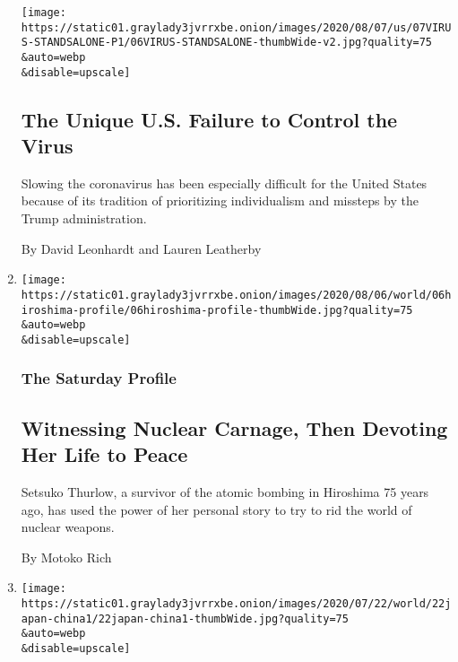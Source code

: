 \begin{enumerate}
  \texttt{[image: https://static01.graylady3jvrrxbe.onion/images/2020/08/07/us/07VIRUS-STANDSALONE-P1/06VIRUS-STANDSALONE-thumbWide-v2.jpg?quality=75\\\&auto=webp\\\&disable=upscale]}

  \hypertarget{the-unique-us-failure-to-control-the-virus}{%
  \subsection{The Unique U.S. Failure to Control the
  Virus}\label{the-unique-us-failure-to-control-the-virus}}

  Slowing the coronavirus has been especially difficult for the United
  States because of its tradition of prioritizing individualism and
  missteps by the Trump administration.

  By David Leonhardt and Lauren Leatherby
\item
  \href{/2020/08/06/world/asia/hiroshima-japan-setsuko-thurlow.html}{}

  \texttt{[image: https://static01.graylady3jvrrxbe.onion/images/2020/08/06/world/06hiroshima-profile/06hiroshima-profile-thumbWide.jpg?quality=75\\\&auto=webp\\\&disable=upscale]}

  \hypertarget{the-saturday-profile}{%
  \subsubsection{The Saturday Profile}\label{the-saturday-profile}}

  \hypertarget{witnessing-nuclear-carnage-then-devoting-her-life-to-peace}{%
  \subsection{Witnessing Nuclear Carnage, Then Devoting Her Life to
  Peace}\label{witnessing-nuclear-carnage-then-devoting-her-life-to-peace}}

  Setsuko Thurlow, a survivor of the atomic bombing in Hiroshima 75
  years ago, has used the power of her personal story to try to rid the
  world of nuclear weapons.

  By Motoko Rich
\item
  \href{/2020/07/25/world/asia/japan-china-xi.html}{}

  \texttt{[image: https://static01.graylady3jvrrxbe.onion/images/2020/07/22/world/22japan-china1/22japan-china1-thumbWide.jpg?quality=75\\\&auto=webp\\\&disable=upscale]}

  \hypertarget{as-the-world-gets-tougher-on-china-japan-tries-to-thread-a-needle}{%
}
\end{enumerate}
